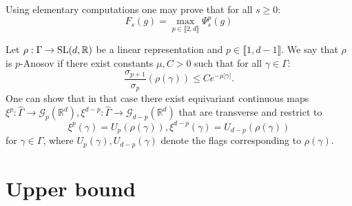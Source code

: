 \documentclass{report}
\begin{document}
\begin{remark}
    Using elementary computations one may prove that for all $s \geq 0$:
    \[
        F_s(g) = \max_{p \in \llbracket 2, d \rrbracket} \Psi_s^p(g)
    \]
\end{remark}

\begin{definition}
Let $\rho: \Gamma \to \operatorname{{\mathrm{SL}}}(d, \mathbb R)$ be a linear representation and $p \in \llbracket 1, d-1 \rrbracket$.
We say that $\rho$ is $p$-Anosov if there exist constants $\mu, C>0$ such that for all $\gamma \in \Gamma$:
\[
    \frac{\sigma_{p+1}}{\sigma_p}(\rho(\gamma)) \leq C e^{-\mu |\gamma|}.
\]
One can show that in that case there exist equivariant continuous maps $\xi^p: \hat \Gamma \to \mathcal G_p(\mathbb R^d) , \xi^{d-p}: \hat \Gamma \to \mathcal G_{d-p}(\mathbb R^d)$ that are transverse and restrict to
\[
    \xi^p(\gamma) = U_p(\rho(\gamma)), \xi^{d-p}(\gamma) = U_{d-p}(\rho(\gamma))
\]
for $\gamma \in \Gamma$, where $U_p(\gamma), U_{d-p}(\gamma)$ denote the flags 
corresponding to  $\rho(\gamma)$.
\end{definition}
\chapter{Upper bound}
\end{document}
